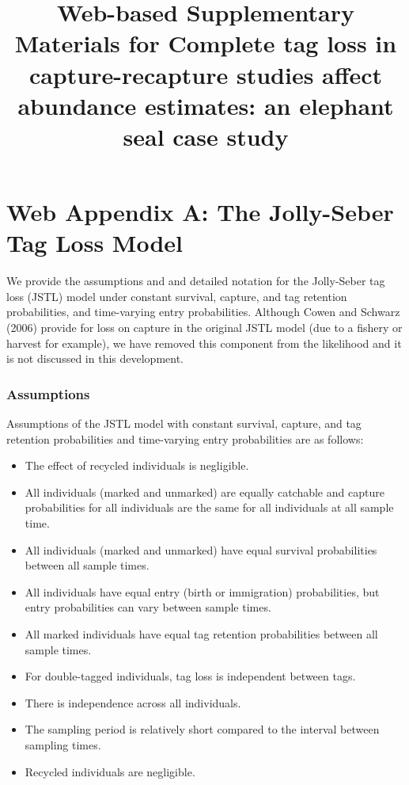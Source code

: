 \documentclass[]{article}
\title{Web-based Supplementary Materials for Complete tag loss in capture-recapture studies affect abundance estimates: an elephant seal case study}
\author{}
\date{}
\providecommand{\tightlist}{%
  \setlength{\itemsep}{0pt}\setlength{\parskip}{0pt}}
\begin{document}
\maketitle

\section{Web Appendix A: The Jolly-Seber Tag Loss
Model}\label{web-appendix-a-the-jolly-seber-tag-loss-model}

We provide the assumptions and and detailed notation for the Jolly-Seber tag loss (JSTL) model under constant survival, capture, and tag retention probabilities, and time-varying entry probabilities.  Although Cowen and Schwarz (2006) provide for loss on capture in the original JSTL model (due to a fishery or harvest for example), we have removed this component from the likelihood and it is not discussed in this development.

\subsubsection{Assumptions}\label{assumptions}

Assumptions of the JSTL model with constant survival, capture, and tag
retention probabilities and time-varying entry probabilities are as
follows:

\begin{itemize}
\tightlist
\item
  The effect of recycled individuals is negligible.
\item
  All individuals (marked and unmarked) are equally catchable and 
  capture probabilities for all individuals are the same for all
  individuals at all sample time.
\item
  All individuals (marked and unmarked) have equal survival
  probabilities between all sample times.
\item
  All individuals have equal entry (birth or immigration) probabilities,
  but entry probabilities can vary between sample times.
\item
  All marked individuals have equal tag retention probabilities between
  all sample times.
\item
  For double-tagged individuals, tag loss is independent between tags.
\item
  There is independence across all individuals.
\item
  The sampling period is relatively short compared to the interval
  between sampling times.
\item
Recycled individuals are negligible.  
\end{itemize}
\end{document}
